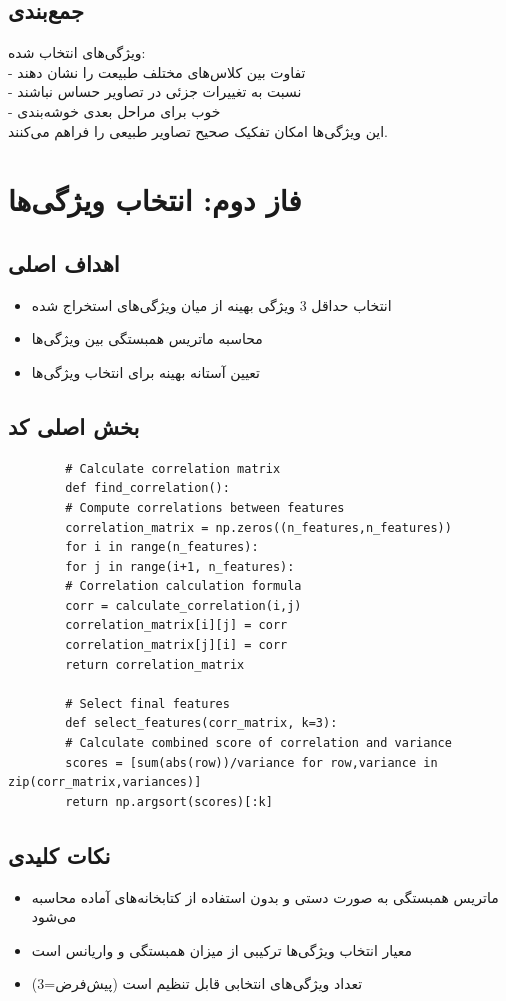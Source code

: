\documentclass[a4paper,12pt]{article}
\let\nobreaksection\section
\renewcommand{\section}{\nobreaksection}
\begin{document}
\subsection*{\textbf{جمع‌بندی}}
ویژگی‌های انتخاب شده:
\\
- تفاوت بین کلاس‌های مختلف طبیعت را نشان دهند
\\
- نسبت به تغییرات جزئی در تصاویر حساس نباشند
\\
- خوب برای مراحل بعدی خوشه‌بندی 
\\
این ویژگی‌ها امکان تفکیک صحیح تصاویر طبیعی را فراهم می‌کنند.
	
	
	\section{فاز دوم: انتخاب ویژگی‌ها}
	
	\subsection{اهداف اصلی}
	\begin{itemize}
		\item انتخاب حداقل 3 ویژگی بهینه از میان ویژگی‌های استخراج شده
		\item محاسبه ماتریس همبستگی بین ویژگی‌ها
		\item تعیین آستانه بهینه برای انتخاب ویژگی‌ها
	\end{itemize}
	
	\subsection{بخش اصلی کد}
\begin{latin}
	\begin{verbatim}
		# Calculate correlation matrix
		def find_correlation():
		# Compute correlations between features
		correlation_matrix = np.zeros((n_features,n_features))
		for i in range(n_features):
		for j in range(i+1, n_features):
		# Correlation calculation formula
		corr = calculate_correlation(i,j)
		correlation_matrix[i][j] = corr
		correlation_matrix[j][i] = corr
		return correlation_matrix
		
		# Select final features
		def select_features(corr_matrix, k=3):
		# Calculate combined score of correlation and variance
		scores = [sum(abs(row))/variance for row,variance in zip(corr_matrix,variances)]
		return np.argsort(scores)[:k]
	\end{verbatim}
\end{latin}
	
	\subsection{نکات کلیدی}
	\begin{itemize}
		\item ماتریس همبستگی به صورت دستی و بدون استفاده از کتابخانه‌های آماده محاسبه می‌شود
		\item معیار انتخاب ویژگی‌ها ترکیبی از میزان همبستگی و واریانس است
		\item تعداد ویژگی‌های انتخابی قابل تنظیم است (پیش‌فرض=3)
	\end{itemize}
	
\end{document}
